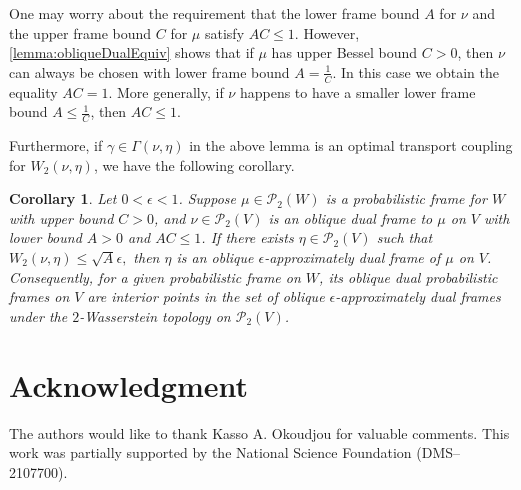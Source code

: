 \documentclass{amsart}
\numberwithin{equation}{section}
\theoremstyle{plain}
\newtheorem{corollary}[theorem]{Corollary}
\theoremstyle{remark}
\theoremstyle{definition}
\begin{document}
One may worry about the requirement that the lower frame bound \(A\) for \(\nu\) and the upper frame bound \(C\) for \(\mu\) satisfy 
\(AC \le 1\). However, \cref{lemma:obliqueDualEquiv} shows that if 
\(\mu\) has upper Bessel bound \(C>0\), then \(\nu\) can always be chosen 
with lower frame bound \(A = \frac{1}{C}\). In this case we obtain the 
equality \(AC = 1\). More generally, if \(\nu\) happens to have a smaller 
lower frame bound \(A \le \frac{1}{C}\), then \(AC \le 1\). 

Furthermore, if $\gamma \in \Gamma(\nu, \eta)$ in the above lemma is an optimal transport coupling for $W_2(\nu, \eta)$, we have the following corollary.
\begin{corollary} \label{interiorPoint}
Let $0< \epsilon <1$. Suppose $\mu \in \mathcal{P}_2(W)$ is a probabilistic frame for $W$ with upper bound $C>0$, and $\nu \in \mathcal{P}_2(V)$  is an oblique dual frame to $\mu$ on $V$ with lower bound $A>0$ and $AC\leq 1$.  If there exists $\eta \in \mathcal{P}_2(V)$ such that $W_2(\nu, \eta)  \leq \sqrt{A}\epsilon,$
 then $\eta$ is an oblique $\epsilon$-approximately dual frame of $\mu$ on $V$.
Consequently, for a given probabilistic frame on $W$, its oblique dual probabilistic frames on $V$ are interior points in the set of oblique $\epsilon$-approximately dual frames under the $2$-Wasserstein topology on $\mathcal{P}_2(V)$. 
\end{corollary}


\section*{Acknowledgment}
The authors would like to thank Kasso A. Okoudjou for valuable comments. This work was partially supported by the National Science Foundation (DMS–2107700).
 

\end{document}
